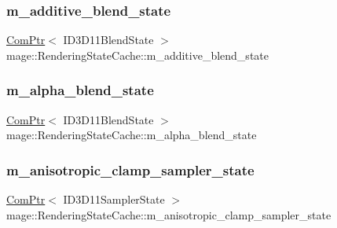 \subsubsection{\texorpdfstring{m\+\_\+additive\+\_\+blend\+\_\+state}{m\_additive\_blend\_state}}
{\footnotesize\ttfamily \hyperlink{namespacemage_ae74f374780900893caa5555d1031fd79}{Com\+Ptr}$<$ I\+D3\+D11\+Blend\+State $>$ mage\+::\+Rendering\+State\+Cache\+::m\+\_\+additive\+\_\+blend\+\_\+state\hspace{0.3cm}{\ttfamily [private]}}

\hypertarget{structmage_1_1_rendering_state_cache_a4eda3c0aeeaca45e4e07358267bb8ae6}{}\label{structmage_1_1_rendering_state_cache_a4eda3c0aeeaca45e4e07358267bb8ae6} 
\subsubsection{\texorpdfstring{m\+\_\+alpha\+\_\+blend\+\_\+state}{m\_alpha\_blend\_state}}
{\footnotesize\ttfamily \hyperlink{namespacemage_ae74f374780900893caa5555d1031fd79}{Com\+Ptr}$<$ I\+D3\+D11\+Blend\+State $>$ mage\+::\+Rendering\+State\+Cache\+::m\+\_\+alpha\+\_\+blend\+\_\+state\hspace{0.3cm}{\ttfamily [private]}}

\hypertarget{structmage_1_1_rendering_state_cache_a56467ab3877bfb1fa547efe4e4a62cc7}{}\label{structmage_1_1_rendering_state_cache_a56467ab3877bfb1fa547efe4e4a62cc7} 
\subsubsection{\texorpdfstring{m\+\_\+anisotropic\+\_\+clamp\+\_\+sampler\+\_\+state}{m\_anisotropic\_clamp\_sampler\_state}}
{\footnotesize\ttfamily \hyperlink{namespacemage_ae74f374780900893caa5555d1031fd79}{Com\+Ptr}$<$ I\+D3\+D11\+Sampler\+State $>$ mage\+::\+Rendering\+State\+Cache\+::m\+\_\+anisotropic\+\_\+clamp\+\_\+sampler\+\_\+state\hspace{0.3cm}{\ttfamily [private]}}

